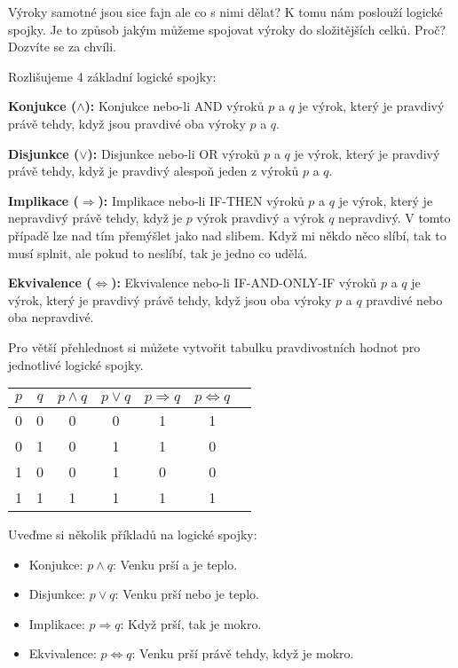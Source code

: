 Výroky samotné jsou sice fajn ale co s nimi dělat? K tomu nám poslouží logické spojky. Je to způsob jakým můžeme spojovat výroky do složitějších celků. Proč? Dozvíte se za chvíli.

\begin{definitionbox}
  Rozlišujeme 4 základní logické spojky:

  \textbf{Konjukce ($\land$):} Konjukce nebo-li AND výroků $p$ a $q$ je výrok, který je pravdivý právě tehdy, když jsou pravdivé oba výroky $p$ a $q$. 

  \textbf{Disjunkce ($\lor$):} Disjunkce nebo-li OR výroků $p$ a $q$ je výrok, který je pravdivý právě tehdy, když je pravdivý alespoň jeden z výroků $p$ a $q$.

  \textbf{Implikace ($\Rightarrow$):} Implikace nebo-li IF-THEN výroků $p$ a $q$ je výrok, který je nepravdivý právě tehdy, když je $p$ výrok pravdivý a výrok $q$ nepravdivý. V tomto případě lze nad tím přemýšlet jako nad slibem. Když mi někdo něco slíbí, tak to musí splnit, ale pokud to neslíbí, tak je jedno co udělá.

  \textbf{Ekvivalence ($\Leftrightarrow$):} Ekvivalence nebo-li IF-AND-ONLY-IF výroků $p$ a $q$ je výrok, který je pravdivý právě tehdy, když jsou oba výroky $p$ a $q$ pravdivé nebo oba nepravdivé.

  \vspace{0.2cm}

  Pro větší přehlednost si můžete vytvořit tabulku pravdivostních hodnot pro jednotlivé logické spojky.

  \begin{center}
    \begin{tabular}{|c|c|c|c|c|c|c|}
      \hline
      $p$ & $q$ & $p \land q$ & $p \lor q$ & $p \Rightarrow q$ & $p \Leftrightarrow q$ \\
      \hline
      0 & 0 & 0 & 0 & 1 & 1 \\
      0 & 1 & 0 & 1 & 1 & 0 \\
      1 & 0 & 0 & 1 & 0 & 0 \\
      1 & 1 & 1 & 1 & 1 & 1 \\
      \hline
    \end{tabular}
  \end{center}
\end{definitionbox}

\pagebreak

\begin{example}
  Uveďme si několik příkladů na logické spojky:
  \begin{itemize}
    \item Konjukce: $p \land q$: Venku prší a je teplo.
    \item Disjunkce: $p \lor q$: Venku prší nebo je teplo.
    \item Implikace: $p \Rightarrow q$: Když prší, tak je mokro.
    \item Ekvivalence: $p \Leftrightarrow q$: Venku prší právě tehdy, když je mokro.
  \end{itemize}
\end{example}

